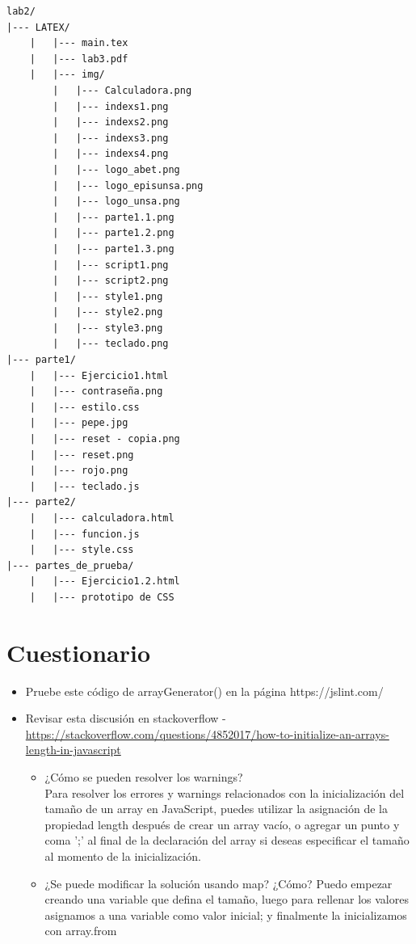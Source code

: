 \documentclass{article}
\begin{document}
\begin{lstlisting}[style=ascii-tree]
lab2/
|--- LATEX/
    |   |--- main.tex
    |   |--- lab3.pdf
    |   |--- img/
        |   |--- Calculadora.png
        |   |--- indexs1.png
        |   |--- indexs2.png
        |   |--- indexs3.png
        |   |--- indexs4.png
        |   |--- logo_abet.png
        |   |--- logo_episunsa.png
        |   |--- logo_unsa.png
        |   |--- parte1.1.png
        |   |--- parte1.2.png
        |   |--- parte1.3.png
        |   |--- script1.png
        |   |--- script2.png
        |   |--- style1.png
        |   |--- style2.png
        |   |--- style3.png
        |   |--- teclado.png
|--- parte1/
    |   |--- Ejercicio1.html
    |   |--- contraseña.png
    |   |--- estilo.css
    |   |--- pepe.jpg
    |   |--- reset - copia.png
    |   |--- reset.png
    |   |--- rojo.png
    |   |--- teclado.js
|--- parte2/
    |   |--- calculadora.html
    |   |--- funcion.js
    |   |--- style.css
|--- partes_de_prueba/
    |   |--- Ejercicio1.2.html
    |   |--- prototipo de CSS
\end{lstlisting}
\section{Cuestionario}
\begin{itemize}
    \item Pruebe este código de arrayGenerator() en la página https://jslint.com/
    \item Revisar esta discusión en stackoverflow - \url{https://stackoverflow.com/questions/4852017/how-to-initialize-an-arrays-length-in-javascript}
    \begin{itemize}
        \item ¿Cómo se pueden resolver los warnings?
        \\Para resolver los errores y warnings relacionados con la inicialización del tamaño de un array en JavaScript, puedes utilizar la asignación de la propiedad length después de crear un array vacío, o agregar un punto y coma ';' al final de la declaración del array si deseas especificar el tamaño al momento de la inicialización.
        \item ¿Se puede modificar la solución usando map? ¿Cómo?
        Puedo empezar creando una variable que defina el tamaño, luego para rellenar los valores asignamos a una variable como valor inicial; y finalmente la inicializamos con array.from
    \end{itemize}
\end{itemize}
\end{document}
